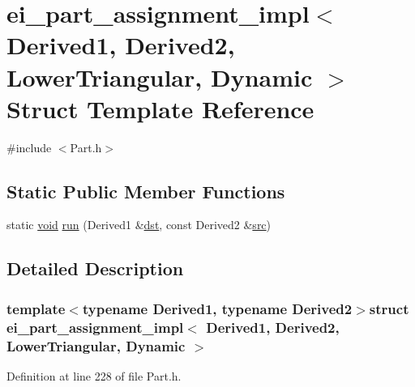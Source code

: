 \hypertarget{structei__part__assignment__impl_3_01_derived1_00_01_derived2_00_01_lower_triangular_00_01_dynamic_01_4}{\section{ei\-\_\-part\-\_\-assignment\-\_\-impl$<$ Derived1, Derived2, Lower\-Triangular, Dynamic $>$ Struct Template Reference}
\label{structei__part__assignment__impl_3_01_derived1_00_01_derived2_00_01_lower_triangular_00_01_dynamic_01_4}
}


{\ttfamily \#include $<$Part.\-h$>$}

\subsection*{Static Public Member Functions}
\begin{DoxyCompactItemize}
\item 
static \hyperlink{group___u_a_v_objects_plugin_ga444cf2ff3f0ecbe028adce838d373f5c}{void} \hyperlink{structei__part__assignment__impl_3_01_derived1_00_01_derived2_00_01_lower_triangular_00_01_dynamic_01_4_a203ec2083e9c92e4209bdb1661a88442}{run} (Derived1 \&\hyperlink{glext_8h_a92034251bfd455d524a9b5610cddba00}{dst}, const Derived2 \&\hyperlink{glext_8h_a72e0fdf0f845ded60b1fada9e9195cd7}{src})
\end{DoxyCompactItemize}


\subsection{Detailed Description}
\subsubsection*{template$<$typename Derived1, typename Derived2$>$struct ei\-\_\-part\-\_\-assignment\-\_\-impl$<$ Derived1, Derived2, Lower\-Triangular, Dynamic $>$}



Definition at line 228 of file Part.\-h.



